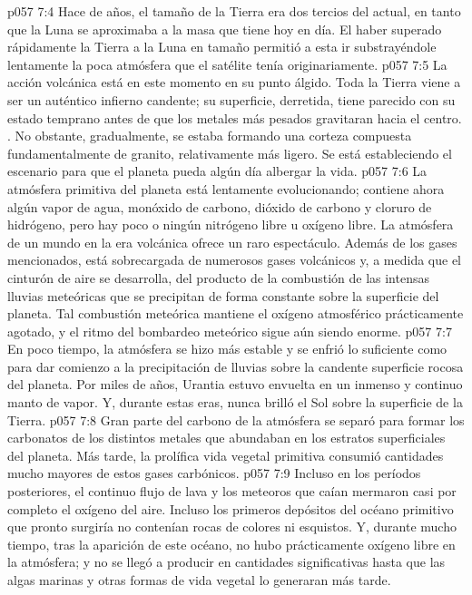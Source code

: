 \vs p057 7:4 \pc Hace  de años, el tamaño de la Tierra era dos tercios del actual, en tanto que la Luna se aproximaba a la masa que tiene hoy en día. El haber superado rápidamente la Tierra a la Luna en tamaño permitió a esta ir substrayéndole lentamente la poca atmósfera que el satélite tenía originariamente.
\vs p057 7:5 La acción volcánica está en este momento en su punto álgido. Toda la Tierra viene a ser un auténtico infierno candente; su superficie, derretida, tiene parecido con su estado temprano antes de que los metales más pesados gravitaran hacia el centro. . No obstante, gradualmente, se estaba formando una corteza compuesta fundamentalmente de granito, relativamente más ligero. Se está estableciendo el escenario para que el planeta pueda algún día albergar la vida.
\vs p057 7:6 \pc La atmósfera primitiva del planeta está lentamente evolucionando; contiene ahora algún vapor de agua, monóxido de carbono, dióxido de carbono y cloruro de hidrógeno, pero hay poco o ningún nitrógeno libre u oxígeno libre. La atmósfera de un mundo en la era volcánica ofrece un raro espectáculo. Además de los gases mencionados, está sobrecargada de numerosos gases volcánicos y, a medida que el cinturón de aire se desarrolla, del producto de la combustión de las intensas lluvias meteóricas que se precipitan de forma constante sobre la superficie del planeta. Tal combustión meteórica mantiene el oxígeno atmosférico prácticamente agotado, y el ritmo del bombardeo meteórico sigue aún siendo enorme.
\vs p057 7:7 \pc En poco tiempo, la atmósfera se hizo más estable y se enfrió lo suficiente como para dar comienzo a la precipitación de lluvias sobre la candente superficie rocosa del planeta. Por miles de años, Urantia estuvo envuelta en un inmenso y continuo manto de vapor. Y, durante estas eras, nunca brilló el Sol sobre la superficie de la Tierra.
\vs p057 7:8 Gran parte del carbono de la atmósfera se separó para formar los carbonatos de los distintos metales que abundaban en los estratos superficiales del planeta. Más tarde, la prolífica vida vegetal primitiva consumió cantidades mucho mayores de estos gases carbónicos.
\vs p057 7:9 Incluso en los períodos posteriores, el continuo flujo de lava y los meteoros que caían mermaron casi por completo el oxígeno del aire. Incluso los primeros depósitos del océano primitivo que pronto surgiría no contenían rocas de colores ni esquistos. Y, durante mucho tiempo, tras la aparición de este océano, no hubo prácticamente oxígeno libre en la atmósfera; y no se llegó a producir en cantidades significativas hasta que las algas marinas y otras formas de vida vegetal lo generaran más tarde.
